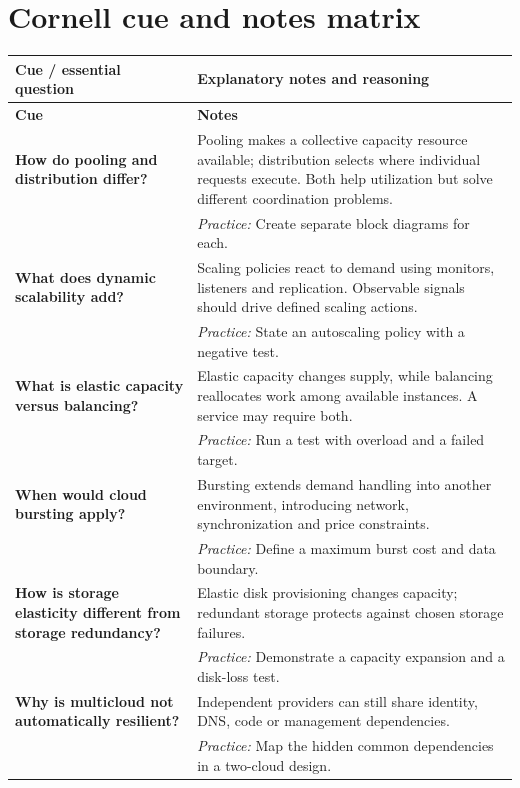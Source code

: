 \documentclass[10pt,letterpaper]{article}
\begin{document}
\section{Cornell cue and notes matrix}
\small\setlength{\LTleft}{0pt}\setlength{\LTright}{0pt plus 1fill}
\begin{longtable}{>{\RaggedRight\arraybackslash}p{}>{\RaggedRight\arraybackslash}p{}}
\toprule\textbf{Cue / essential question}&\textbf{Explanatory notes and reasoning}\\\midrule\endfirsthead\toprule\textbf{Cue}&\textbf{Notes}\\\midrule\endhead
\textbf{How do pooling and distribution differ?} & Pooling makes a collective capacity resource available; distribution selects where individual requests execute. Both help utilization but solve different coordination problems.\\[3pt]& \textcolor{petrol}{\emph{Practice:} Create separate block diagrams for each.}\\[8pt]\midrule
\textbf{What does dynamic scalability add?} & Scaling policies react to demand using monitors, listeners and replication. Observable signals should drive defined scaling actions.\\[3pt]& \textcolor{petrol}{\emph{Practice:} State an autoscaling policy with a negative test.}\\[8pt]\midrule
\textbf{What is elastic capacity versus balancing?} & Elastic capacity changes supply, while balancing reallocates work among available instances. A service may require both.\\[3pt]& \textcolor{petrol}{\emph{Practice:} Run a test with overload and a failed target.}\\[8pt]\midrule
\textbf{When would cloud bursting apply?} & Bursting extends demand handling into another environment, introducing network, synchronization and price constraints.\\[3pt]& \textcolor{petrol}{\emph{Practice:} Define a maximum burst cost and data boundary.}\\[8pt]\midrule
\textbf{How is storage elasticity different from storage redundancy?} & Elastic disk provisioning changes capacity; redundant storage protects against chosen storage failures.\\[3pt]& \textcolor{petrol}{\emph{Practice:} Demonstrate a capacity expansion and a disk-loss test.}\\[8pt]\midrule
\textbf{Why is multicloud not automatically resilient?} & Independent providers can still share identity, DNS, code or management dependencies.\\[3pt]& \textcolor{petrol}{\emph{Practice:} Map the hidden common dependencies in a two-cloud design.}\\[8pt]\midrule
\end{longtable}\normalsize
\end{document}
